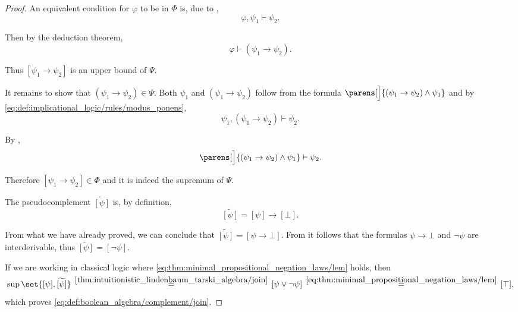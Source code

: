 \begin{proof}
  An equivalent condition for \( \varphi \) to be in \( \Phi \) is, due to ,
  \begin{equation*}
    \varphi, \psi_1 \vdash \psi_2.
  \end{equation*}

  Then by the deduction theorem,
  \begin{equation*}
    \varphi \vdash (\psi_1 \rightarrow \psi_2).
  \end{equation*}

  Thus \( [\psi_1 \rightarrow \psi_2] \) is an upper bound of \( \Psi \).

  It remains to show that \( (\psi_1 \rightarrow \psi_2) \in \Psi \). Both \( \psi_1 \) and \( (\psi_1 \rightarrow \psi_2) \) follow from the formula \( \parens[\Big]{ (\psi_1 \rightarrow \psi_2) \wedge \psi_1 } \) and by \eqref{eq:def:implicational_logic/rules/modus_ponens},
  \begin{equation*}
    \psi_1, (\psi_1 \rightarrow \psi_2) \vdash \psi_2.
  \end{equation*}

  By ,
  \begin{equation*}
    \parens[\Big]{ (\psi_1 \rightarrow \psi_2) \wedge \psi_1 } \vdash \psi_2.
  \end{equation*}

  Therefore \( [\psi_1 \rightarrow \psi_2] \in \Phi \) and it is indeed the supremum of \( \Psi \).

   The pseudocomplement \( \widetilde{[\psi]} \) is, by definition,
  \begin{equation*}
    \widetilde{[\psi]}
    =
    [\psi] \rightarrow [\bot].
  \end{equation*}

  From what we have already proved, we can conclude that \( \widetilde{[\psi]} = [\psi \rightarrow \bot] \). From  it follows that the formulas \( \psi \rightarrow \bot \) and \( \neg \psi \) are interderivable, thus \( \widetilde{[\psi]} = [\neg \psi] \).

  If we are working in classical logic where \eqref{eq:thm:minimal_propositional_negation_laws/lem} holds, then
  \begin{equation*}
    \sup\set{ [\psi], \widetilde{[\psi]} }
    \reloset {\ref{thm:intuitionistic_lindenbaum_tarski_algebra/join}} =
    [\psi \vee \neg \psi]
    \reloset {\eqref{eq:thm:minimal_propositional_negation_laws/lem}} =
    [\top],
  \end{equation*}
  which proves \eqref{eq:def:boolean_algebra/complement/join}.


\end{proof}
